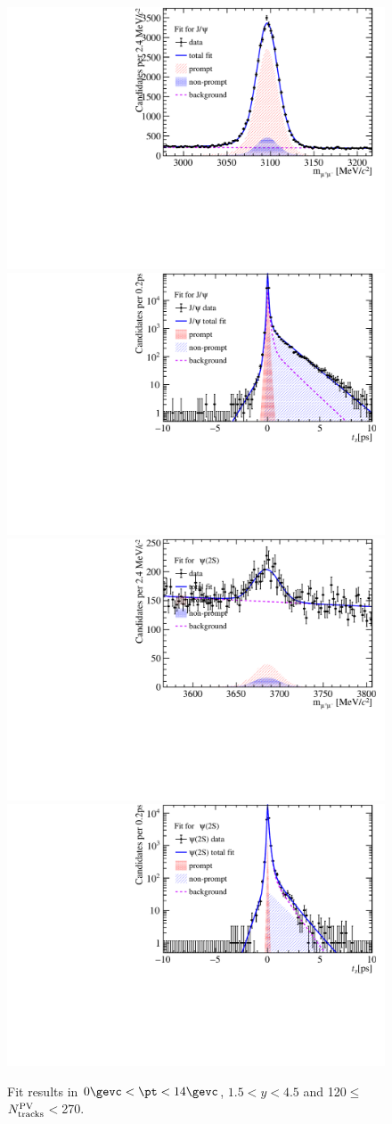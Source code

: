 \begin{figure}[H]
\begin{center}
\includegraphics[width=0.45\linewidth]{pdf/pPb/Workdir/TwoDimFit/ProjMass/Jpsi_n5y1pt1.pdf}
\includegraphics[width=0.45\linewidth]{pdf/pPb/Workdir/TwoDimFit/ProjTz/Jpsi_n5y1pt1.pdf}
\vspace*{-0.5cm}
\includegraphics[width=0.45\linewidth]{pdf/pPb/Workdir/TwoDimFit/ProjMass/Psi2S_n5y1pt1.pdf}
\includegraphics[width=0.45\linewidth]{pdf/pPb/Workdir/TwoDimFit/ProjTz/Psi2S_n5y1pt1.pdf}
\vspace*{-0.5cm}
\end{center}
\caption{Fit results in $0\gevc<\pt<14\gevc$, $1.5<y<4.5$ and 120$\leq$$N^{\rm PV}_{\rm tracks}$$<$270.}
\end{figure}

